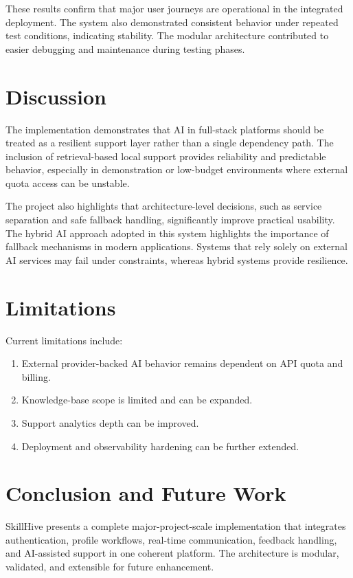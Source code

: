 \documentclass[conference]{IEEEtran}
\begin{document}
These results confirm that major user journeys are operational in the integrated deployment. The system also demonstrated consistent behavior under repeated test conditions, indicating stability. The modular architecture contributed to easier debugging and maintenance during testing phases.

\section{Discussion}
The implementation demonstrates that AI in full-stack platforms should be treated as a resilient support layer rather than a single dependency path. The inclusion of retrieval-based local support provides reliability and predictable behavior, especially in demonstration or low-budget environments where external quota access can be unstable.

The project also highlights that architecture-level decisions, such as service separation and safe fallback handling, significantly improve practical usability. The hybrid AI approach adopted in this system highlights the importance of fallback mechanisms in modern applications. Systems that rely solely on external AI services may fail under constraints, whereas hybrid systems provide resilience.

\section{Limitations}
Current limitations include:
\begin{enumerate}
\item External provider-backed AI behavior remains dependent on API quota and billing.
\item Knowledge-base scope is limited and can be expanded.
\item Support analytics depth can be improved.
\item Deployment and observability hardening can be further extended.
\end{enumerate}

\section{Conclusion and Future Work}
SkillHive presents a complete major-project-scale implementation that integrates authentication, profile workflows, real-time communication, feedback handling, and AI-assisted support in one coherent platform. The architecture is modular, validated, and extensible for future enhancement.
\end{document}
